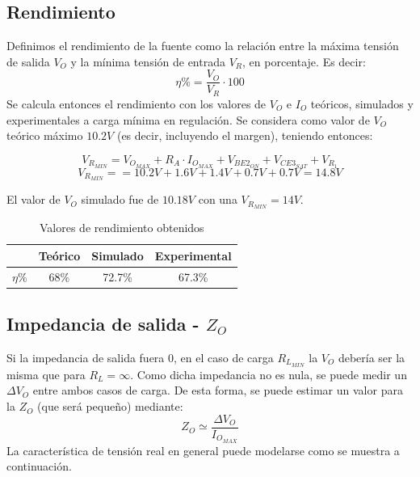 \subsection{Rendimiento}

Definimos el rendimiento de la fuente como la relaci\'on entre la m\'axima tensi\'on de salida $V_O$ y la m\'inima tensi\'on de entrada $V_R$, en porcentaje. Es decir:
\[
\eta \% = \frac{V_O}{V_R} \cdot 100
\]
Se calcula entonces el rendimiento con los valores de $V_O$ e $I_O$ te\'oricos, simulados y experimentales a carga m\'inima en regulaci\'on.
Se considera como valor de $V_O$ te\'orico m\'aximo $10.2V$ (es decir, incluyendo el margen), teniendo entonces:

\[
V_{R_{MIN}} = V_{O_{MAX}} + R_A \cdot I_{O_{MAX}} + V_{BE2_{ON}} + V_{CE3_{SAT}} + V_{R_1}
\]
\[
V_{R_{MIN}} =  = 10.2V + 1.6V + 1.4V + 0.7V + 0.7V = 14.8V 
\]

El valor de $V_O$ simulado fue de $10.18V$ con una $V_{R_{MIN}}= 14V$.

\begin{table}[!ht]
\begin{center}
\begin{tabular}{|c||c|c|c|}
\hline
& Te\'orico & Simulado & Experimental\\
\hline 
$\eta \%$ & 68\% & 72.7\% & 67.3\%\\
\hline 
\end{tabular}
\end{center}

\caption{Valores de rendimiento obtenidos}
\end{table}

\subsection{Impedancia de salida - $Z_O$}
 
Si la impedancia de salida fuera 0, en el caso de carga $R_{L_{MIN}}$ la $V_O$ deber\'ia ser la misma que para $R_L = \infty $. Como dicha impedancia no es nula, se puede medir un $\Delta V_O$ entre ambos casos de carga. De esta forma, se puede estimar un valor para la $Z_O$ (que ser\'a peque\~no) mediante:
\[
Z_O \simeq \frac{\Delta V_O}{I_{O_{MAX}}}   
\]
La caracter\'istica de tensi\'on real en general puede modelarse como se muestra a continuaci\'on.


